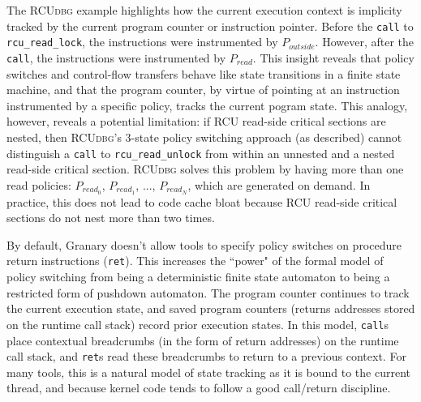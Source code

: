 \documentclass[preprint]{sigplanconf}
\newcommand{\toolname}[1]{{\scshape #1}}
\begin{document}

The \toolname{RCUdbg} example highlights how the current execution context is implicity tracked by the current program counter or instruction pointer. Before the \texttt{call} to \texttt{rcu\_\linebreak[0]read\_\linebreak[0]lock}, the instructions were instrumented by $P_{outside}$. However, after the \texttt{call}, the instructions were instrumented by $P_{read}$. This insight reveals that policy switches and control-flow transfers behave like state transitions in a finite state machine, and that the program counter, by virtue of pointing at an instruction instrumented by a specific policy, tracks the current pogram state. This analogy, however, reveals a potential limitation: if RCU read-side critical sections are nested, then \toolname{RCUdbg}'s 3-state policy switching approach (as described) cannot distinguish a \texttt{call} to \texttt{rcu\_\linebreak[0]read\_\linebreak[0]unlock} from within an unnested and a nested read-side critical section. \toolname{RCUdbg} solves this problem by having more than one read policies: $P_{\mathit{{read}_0}}$, $P_{\mathit{{read}_1}}$, ..., $P_{\mathit{{read}_N}}$, which are generated on demand. In practice, this does not lead to code cache bloat because RCU read-side critical sections do not nest more than two times.

By default, Granary doesn't allow tools to specify policy switches on procedure return instructions (\texttt{ret}). This increases the ``power" of the formal model of policy switching from being a deterministic finite state automaton to being a restricted form of pushdown automaton. The program counter continues to track the current execution state, and saved program counters (returns addresses stored on the runtime call stack) record prior execution states. In this model, \texttt{call}s place contextual breadcrumbs (in the form of return addresses) on the runtime call stack, and \texttt{ret}s read these breadcrumbs to return to a previous context. For many tools, this is a natural model of state tracking as it is bound to the current thread, and because kernel code tends to follow a good call/return discipline.
\end{document}
